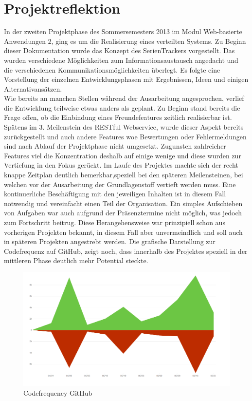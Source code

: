 \chapter{Projektreflektion}
In der zweiten Projektphase des Sommersemesters 2013 im Modul Web-basierte Anwendungen 2, ging es um die Realisierung eines verteilten Systems. Zu Beginn dieser Dokumentation wurde das Konzept des SerienTrackers vorgestellt. Das wurden verschiedene Möglichkeiten zum Informationsaustausch angedacht und die verschiedenen Kommunikationsmöglichkeiten überlegt. Es folgte eine Vorstellung der einzelnen Entwicklungsphasen mit Ergebnissen, Ideen und einigen Alternativansätzen.\\


Wie bereits an manchen Stellen während der Ausarbeitung angesprochen, verlief die Entwicklung teilweise etwas anders als geplant. Zu Beginn stand bereits die Frage offen, ob die Einbindung eines Freundefeatures zeitlich realisierbar ist. Spätens im 3. Meilenstein des RESTful Webservice, wurde dieser Aspekt bereits zurückgestellt und auch andere Features woe Bewertungen oder Fehlermeldungen sind nach Ablauf der Projektphase nicht umgesetzt.
Zugunsten zahlreicher Features viel die Konzentration deshalb auf einige wenige und diese wurden zur Vertiefung in den Fokus gerückt.
Im Laufe des Projektes machte sich der recht knappe Zeitplan deutlich bemerkbar,speziell bei den späteren Meilensteinen, bei welchen vor der Ausarbeitung der Grundlagenstoff vertieft werden muss. Eine kontinuerliche Beschäftigung mit den jeweiligen Inhalten ist in diesem Fall notwendig und vereinfacht einen Teil der Organisation. Ein simples Aufschieben von Aufgaben war auch aufgrund der Präsenztermine nicht möglich, was jedoch zum Fortschritt beitrug. Diese Herangehensweise war prinzipiell schon aus vorherigen Projekten bekannt, in diesem Fall aber unvermeindlich und soll auch in späteren Projekten angestrebt werden.
Die grafische Darstellung zur Codefrequenz auf GitHub, zeigt noch, dass innerhalb des Projektes speziell in der mittleren Phase deutlich mehr Potential steckte. 

\begin{figure}[H]
\includegraphics[width=1\textwidth]{../images/statistik.jpg}
\caption{Codefrequency GitHub }
\label{codefrequency}
\end{figure}


